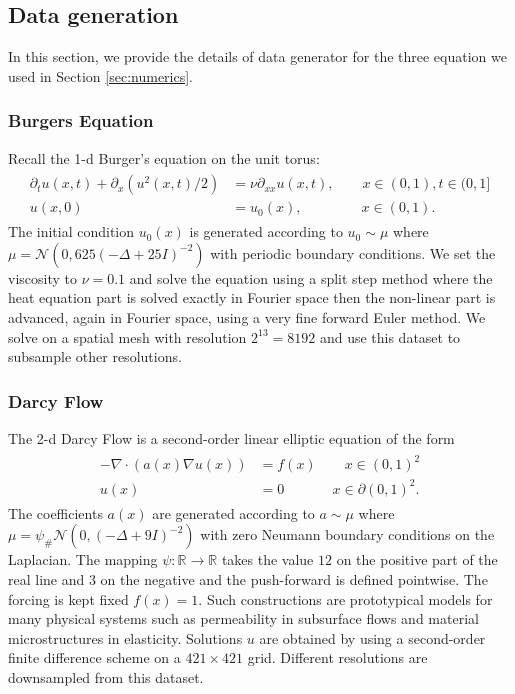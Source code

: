 \documentclass{article} %
\newcommand{\R}{\mathbb{R}}
\begin{document}
\subsection{Data generation}
In this section, we provide the details of data generator for the three equation we used in Section \ref{sec:numerics}.
\subsubsection{Burgers Equation}
\label{app:burgers}
Recall the 1-d Burger's equation on the unit torus:
\begin{align*}
    \begin{split}
    \partial_t u(x,t) + \partial_x ( u^2(x,t)/2) &= \nu \partial_{xx} u(x,t), \qquad x \in (0,1), t \in (0,1] \\
    u(x,0) &= u_0(x), \qquad \qquad \: x \in (0,1).
    \end{split}
\end{align*}
The initial condition $ u_0(x)$ is generated according to 
\(u_0 \sim \mu\) where \(\mu = \mathcal{N}(0,625(-\Delta + 25I)^{-2})\) with periodic boundary conditions. We set the viscosity to \(\nu = 0.1\) and solve the equation using a split step method where the heat equation part is solved exactly in Fourier space then the non-linear part is advanced, again in Fourier space, using a very fine forward Euler method. We solve on a spatial mesh with resolution $2^{13} = 8192$ and use this dataset to subsample other resolutions.

\subsubsection{Darcy Flow}
\label{app:darcy}
The 2-d Darcy Flow is a second-order linear elliptic equation of the form
\begin{align*}
\begin{split}
- \nabla \cdot (a(x) \nabla u(x)) &= f(x) \qquad x \in (0,1)^2 \\
u(x) &= 0 \qquad \quad \:\: x \in \partial (0,1)^2.
\end{split}
\end{align*}
The coefficients $a(x)$ are generated according to \(a \sim \mu \) where \(\mu = \psi_{\#} \mathcal{N}(0,(-\Delta + 9I)^{-2})\)
with zero Neumann boundary conditions on the Laplacian.
The mapping \(\psi : \R \to \R\) takes the value $12$ on the positive part of the real line and $3$ on the negative and the push-forward is defined pointwise. The forcing is kept fixed $f(x) = 1$. Such constructions are prototypical models for many physical systems such as permeability in subsurface flows and material microstructures in elasticity. Solutions \(u\) are obtained by using a second-order finite difference scheme on a $421 \times 421$ grid. Different resolutions are downsampled from this dataset. 
\end{document}
